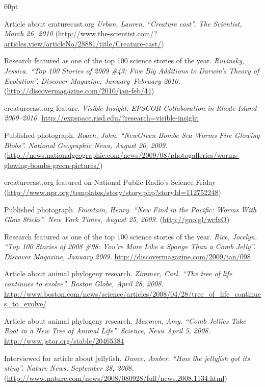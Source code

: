 \begin{entry}{60pt}
\item [\rm 2010] Article about craturecast.org \emph{Urban, Lauren. ``Creature cast''. The Scientist, March 26, 2010} (\url{http://www.the-scientist.com/?articles.view/articleNo/28881/title/Creature-cast/})
\item [\rm 2010] Research featured as one of the top 100 science stories of the year. \emph{Ruvinsky, Jessica. ``Top 100 Stories of 2009 \#43: Five Big Additions to Darwin's Theory of Evolution''. Discover Magazine, January--February 2010.} (\url{http://discovermagazine.com/2010/jan-feb/44})
\item [\rm 2010] creaturecast.org feature. \emph{Visible Insight: EPSCOR Collaboration in Rhode Island 2009--2010.} \url{http://expspace.risd.edu/?research=visible-insight}
\item [\rm 2009] Published photograph. \emph{Roach, John. ``NewGreen Bombe Sea Worms Fire Glowing Blobs''. National Geographic News, August 20, 2009.} (\url{http://news.nationalgeographic.com/news/2009/08/photogalleries/worms-glowing-bombs-green-pictures/})
\item [\rm 2009] creaturecast.org featured on National Public Radio's Science Friday (\url{http://www.npr.org/templates/story/story.php?storyId=112752248})
\item [\rm 2009] Published photograph. \emph{Fountain, Henry. ``New Find in the Pacific: Worms With Glow Sticks''. New York Times, August 25, 2009.} (\url{http://goo.gl/wcfxO})
\item [\rm 2009] Research featured as one of the top 100 science stories of the year. \emph{Rice, Jocelyn. ``Top 100 Stories of 2008 \#98: You're More Like a Sponge Than a Comb Jelly''. Discover Magazine, January 2009.} \url{http://discovermagazine.com/2009/jan/098}
\item [\rm 2008] Article about animal phylogeny research. \emph{Zimmer, Carl. ``The tree of life continues to evolve''. Boston Globe, April 28, 2008.} \url{http://www.boston.com/news/science/articles/2008/04/28/tree_of_life_continues_to_evolve/}
\item [\rm 2008] Article about animal phylogeny research. \emph{Maxmen, Amy. ``Comb Jellies Take Root in a New Tree of Animal Life''. Science, News April 5, 2008.} \url{http://www.jstor.org/stable/20465384}
\item [\rm 2008] Interviewed for article about jellyfish. \emph{Dance, Amber. ``How the jellyfish got its sting''. Nature News, September 28, 2008.} (\url{http://www.nature.com/news/2008/080928/full/news.2008.1134.html})

\end{entry}
